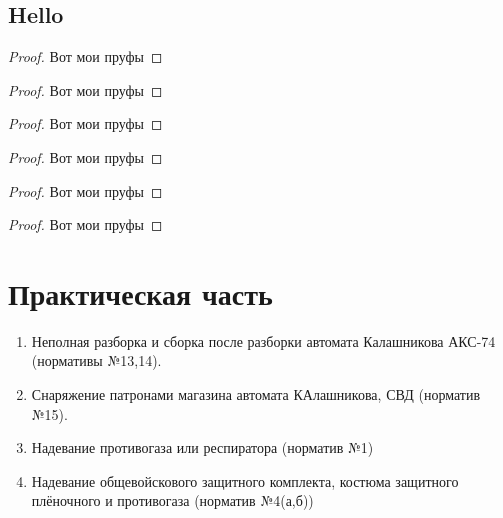 \documentclass[12pt,a4paper]{report}
\begin{document}
\section{Hello}

\begin{proof}
	Вот мои пруфы  
	
\end{proof}
\begin{proof}
	Вот мои пруфы  
	
\end{proof}
\begin{proof}
	Вот мои пруфы  
	
\end{proof}
\begin{proof}
	Вот мои пруфы  
	
\end{proof}
\begin{proof}
	Вот мои пруфы  
	
\end{proof}
\begin{proof}
	Вот мои пруфы  
	
\end{proof}
\chapter{Практическая часть}
\begin{enumerate}
	\item Неполная разборка и сборка после разборки автомата Калашникова АКС-74 (нормативы №13,14).
	\item Снаряжение патронами магазина автомата КАлашникова, СВД (норматив №15).
	\item Надевание противогаза или респиратора (норматив №1) 
	\item Надевание общевойскового защитного комплекта, костюма защитного плёночного и противогаза (норматив №4(а,б))
\end{enumerate}

\end{document}
